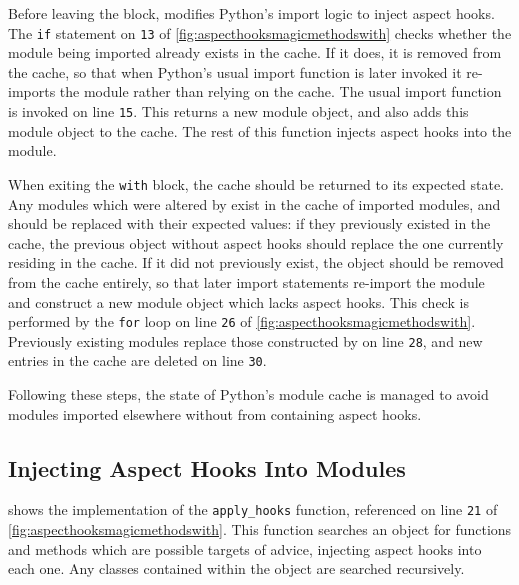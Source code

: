 Before leaving the block, \pdsf{} modifies Python's import logic to inject
aspect hooks. The \lstinline{if} statement on \texttt{13} of
\cref{fig:aspecthooksmagicmethodswith} checks whether the module being imported
already exists in the cache. If it does, it is removed from the cache, so that
when Python's usual import function is later invoked it re-imports the module
rather than relying on the cache. The usual import function is invoked on line
\texttt{15}. This returns a new module object, and also adds this module object
to the cache. The rest of this function injects aspect hooks into the module.

When exiting the \lstinline{with} block, the cache should be returned to its
expected state. Any modules which were altered by \pdsf{} exist in the cache of
imported modules, and should be replaced with their expected values: if they
previously existed in the cache, the previous object without aspect hooks should
replace the one currently residing in the cache. If it did not previously exist,
the object should be removed from the cache entirely, so that later import
statements re-import the module and construct a new module object which lacks
aspect hooks. This check is performed by the \lstinline{for} loop on line
\texttt{26} of \cref{fig:aspecthooksmagicmethodswith}. Previously existing
modules replace those constructed by \pdsf{} on line \texttt{28}, and new
entries in the cache are deleted on line \texttt{30}.

Following these steps, the state of Python's module cache is managed to avoid
modules imported elsewhere without \pdsf{} from containing aspect hooks.

\subsection{Injecting Aspect Hooks Into Modules}
\label{injecting_aspect_hooks_when_importing}

 shows the implementation of the
\lstinline{apply_hooks} function, referenced on line \texttt{21} of
\cref{fig:aspecthooksmagicmethodswith}. This function searches an
object for functions and methods which are possible targets of advice, injecting
aspect hooks into each one. Any classes contained within the object are searched
recursively.

